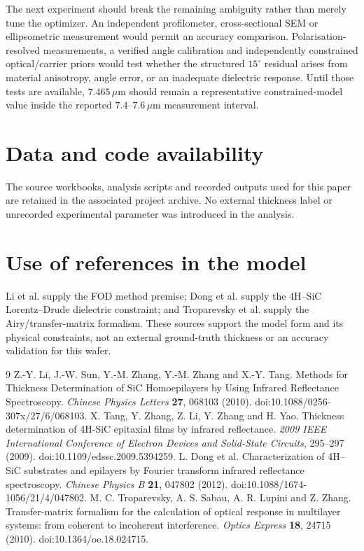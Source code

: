 \documentclass[10pt,a4paper]{article}
\newcommand{\um}{\ensuremath{\mu\mathrm{m}}}
\begin{document}
The next experiment should break the remaining ambiguity rather than merely tune the optimizer. An independent profilometer, cross-sectional SEM or ellipsometric measurement would permit an accuracy comparison. Polarisation-resolved measurements, a verified angle calibration and independently constrained optical/carrier priors would test whether the structured $15^\circ$ residual arises from material anisotropy, angle error, or an inadequate dielectric response. Until those tests are available, $7.465\,\um$ should remain a representative constrained-model value inside the reported $7.4$--$7.6\,\um$ measurement interval.

\section*{Data and code availability}
The source workbooks, analysis scripts and recorded outputs used for this paper are retained in the associated project archive. No external thickness label or unrecorded experimental parameter was introduced in the analysis.

\section*{Use of references in the model}
Li et al. \cite{Li2010} supply the FOD method premise; Dong et al. \cite{Dong2012} supply the 4H--SiC Lorentz--Drude dielectric constraint; and Troparevsky et al. \cite{Troparevsky2010} supply the Airy/transfer-matrix formalism. These sources support the model form and its physical constraints, not an external ground-truth thickness or an accuracy validation for this wafer.

\begin{thebibliography}{9}
 Z.-Y. Li, J.-W. Sun, Y.-M. Zhang, Y.-M. Zhang and X.-Y. Tang. Methods for Thickness Determination of SiC Homoepilayers by Using Infrared Reflectance Spectroscopy. \emph{Chinese Physics Letters} \textbf{27}, 068103 (2010). doi:10.1088/0256-307x/27/6/068103.
 X. Tang, Y. Zhang, Z. Li, Y. Zhang and H. Yao. Thickness determination of 4H-SiC epitaxial films by infrared reflectance. \emph{2009 IEEE International Conference of Electron Devices and Solid-State Circuits}, 295--297 (2009). doi:10.1109/edssc.2009.5394259.
 L. Dong et al. Characterization of 4H--SiC substrates and epilayers by Fourier transform infrared reflectance spectroscopy. \emph{Chinese Physics B} \textbf{21}, 047802 (2012). doi:10.1088/1674-1056/21/4/047802.
 M. C. Troparevsky, A. S. Sabau, A. R. Lupini and Z. Zhang. Transfer-matrix formalism for the calculation of optical response in multilayer systems: from coherent to incoherent interference. \emph{Optics Express} \textbf{18}, 24715 (2010). doi:10.1364/oe.18.024715.
\end{thebibliography}
\end{document}

